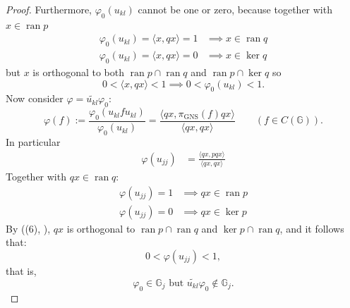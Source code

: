 \documentclass[12pt]{amsart}
\theoremstyle{remark}
\theoremstyle{remark}
\begin{document}
\begin{proof}
Furthermore, $\varphi_0(u_{kl})$ cannot be one or zero, because together with $x\in\operatorname{ran}p$
\begin{align*}
 \varphi_0(u_{kl})= \langle x,qx\rangle =1 & \implies x\in\operatorname{ran}q \\
  \varphi_0(u_{kl})=\langle x,qx\rangle =0 & \implies x\in\ker q
\end{align*}
but $x$ is orthogonal to both $\operatorname{ran}p\cap\operatorname{ran}q$ and $\operatorname{ran} p\cap \ker q$ so
$$0<\langle x,qx\rangle<1\implies 0<\varphi_0(u_{kl})<1.$$
Now consider $\varphi=\widetilde{u_{kl}}\varphi_0$:
$$\varphi(f):=\frac{\varphi_0(u_{kl}f u_{kl})}{\varphi_0(u_{kl})}=\frac{\langle qx,\pi_{\text{GNS}}(f)qx \rangle}{\langle qx,qx\rangle}\qquad (f\in C(\mathbb{G})).$$
In particular
\begin{align*}
  \varphi(u_{jj}) & =\frac{\langle qx,pqx\rangle}{\langle qx,qx\rangle}
\end{align*}
Together with $qx\in\operatorname{ran}q$:
\begin{align*}
  \varphi(u_{jj})=1 & \implies qx\in\operatorname{ran}p \\
  \varphi(u_{jj})=0 & \implies qx\in\operatorname{ker}p
\end{align*}
By ((6), \cite{bos}), $qx$ is orthogonal to $\operatorname{ran}p\cap \operatorname{ran}q$ and $\operatorname{ker}p\cap \operatorname{ran} q$, and it follows that:
$$0<\varphi(u_{jj})<1,$$
that is,
$$\varphi_0\in \mathbb{G}_j\text{ but }\widetilde{u_{kl}}\varphi_0\not \in \mathbb{G}_j.$$
\end{proof}
\end{document}
